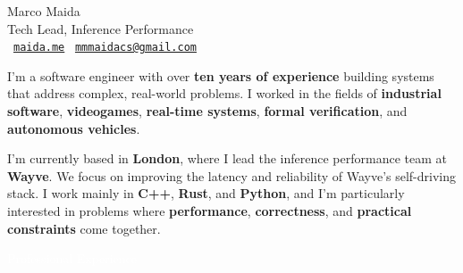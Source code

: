 \documentclass[letterpaper]{article}
\newcounter{colorCounter}
\newcommand{\sectioncolor}[1]{%
  \colorbox{%
    \ifodd\value{colorCounter}mainblue\else maingray\fi%
  }{\textcolor{white}{\strut\hspace{6pt}#1\hspace{6pt}}}%
  \stepcounter{colorCounter}%
}
\renewcommand{\section}[1]{%
  \vspace{1.5em}
  {\Large\sectioncolor{#1}}\par
  \vspace{0.8em}
}
\begin{document}
\begin{minipage}[t]{0.7\linewidth}
  {\Huge\color{mainblue}Marco Maida}\\
  {\Large\color{black!80}Tech Lead, Inference Performance}\\
  \vspace{4pt}
  \faGlobe~\href{https://www.maida.me}{\texttt{maida.me}} \quad
  \faEnvelope~\href{mailto:mmmaidacs@gmail.com}{\texttt{mmmaidacs@gmail.com}}
\end{minipage}

\vspace{.5cm}

I’m a software engineer with over \textbf{ten years of experience} building systems that address complex, real-world problems. I worked in the fields of \textbf{industrial software}, \textbf{videogames}, \textbf{real-time systems},  \textbf{formal verification}, and \textbf{autonomous vehicles}.

I’m currently based in \textbf{London}, where I lead the inference performance team at \textbf{Wayve}. We focus on improving the latency and reliability of Wayve’s self-driving stack. I work mainly in \textbf{C++}, \textbf{Rust}, and \textbf{Python}, and I’m particularly interested in problems where \textbf{performance}, \textbf{correctness}, and \textbf{practical constraints} come together.

\vspace{.1cm}

\section{Professional Experience}
\end{document}
